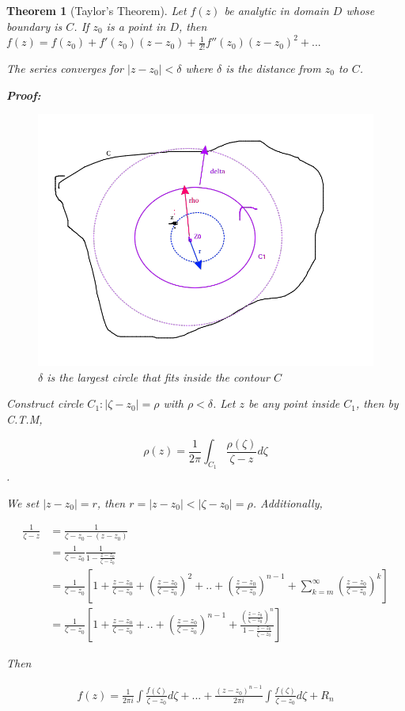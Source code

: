 \documentclass{article}
\newtheorem{theorem}{Theorem}[section]
\theoremstyle{definition}
\begin{document}
\begin{theorem}[Taylor's Theorem]
Let $f(z)$ be analytic in domain $D$ whose boundary is $C$. If $z_0$ is a point in $D$, then $f(z) = f(z_0) + f'(z_0)(z-z_0) + \frac{1}{2!} f''(z_0) (z-z_0)^2+...$

The series converges for $|z-z_0|<\delta$ where $\delta$ is the distance from $z_0$ to $C$. 

\textbf{Proof:}
\begin{figure}[H]
	\centering
	\includegraphics[width=0.5\linewidth]{disc}
	\caption{$\delta$ is the largest circle that fits inside the contour $C$}
	\label{fig:disk}
\end{figure}

Construct circle $C_1:|\zeta - z_0| = \rho$ with $\rho < \delta$. Let $z$ be any point inside $C_1$, then by C.T.M, 

$$\rho(z) = \frac{1}{2 \pi} \int_{C_1} \frac{\rho(\zeta)}{\zeta - z} d\zeta$$.

We set $|z-z_0| = r$, then $ r = |z-z_0|  < |\zeta - z_0| = \rho$. Additionally, 

\begin{align}
\frac{1}{\zeta - z} &= \frac{1}{\zeta - z_0 - (z - z_0)}\\
&= \frac{1}{\zeta - z_0} \frac{1}{1-\frac{z-z_0}{\zeta - z_0}}\\
&= \frac{1}{\zeta - z_0} \left[1 + \frac{z-z_0}{\zeta - z_0} + \left(\frac{z-z_0}{\zeta - z_0}\right)^2 + .. + \left(\frac{z-z_0}{\zeta - z_0}\right)^{n-1} + \sum_{k=m}^\infty \left(\frac{z-z_0}{\zeta - z_0}\right)^k\right] \\ 
&= \frac{1}{\zeta - z_0} \left[1 + \frac{z-z_0}{\zeta - z_0} + .. + \left(\frac{z-z_0}{\zeta - z_0}\right)^{n-1} + \frac{\left(\frac{z-z_0}{\zeta - z_0}\right)^n}{1-\frac{z-z_0}{\zeta - z_0}}\right]
\end{align}

Then 

\begin{align}
f(z) = \frac{1}{2 \pi i } \int \frac{f(\zeta)}{\zeta - z_0} d\zeta + ... + \frac{(z-z_0)^{n-1}}{2 \pi i}\int \frac{f(\zeta)}{\zeta - z_0} d\zeta + R_n
\end{align}


\end{theorem}
\end{document}
